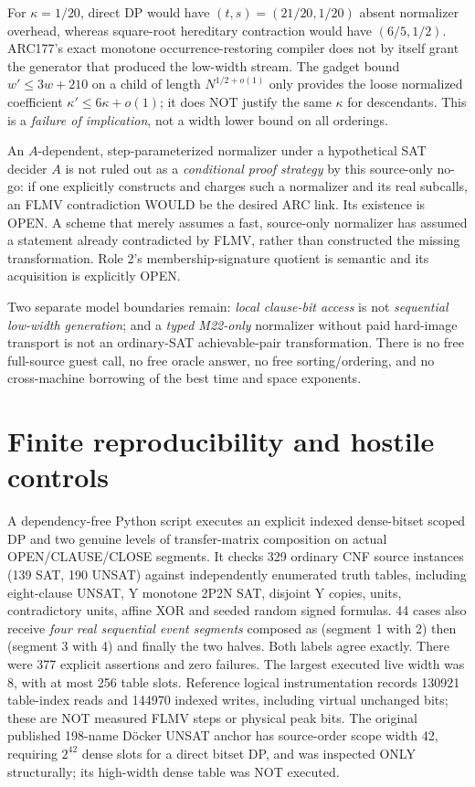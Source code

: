 \documentclass[11pt]{article}
\begin{document}
For $\kappa=1/20$, direct DP would have $(t,s)=(21/20,1/20)$ absent
normalizer overhead, whereas square-root hereditary contraction would have
$(6/5,1/2)$. ARC177's exact monotone occurrence-restoring compiler does not
by itself grant the generator that produced the low-width stream. The
gadget bound $w'\le3w+210$ on a child of length $N^{1/2+o(1)}$
only provides the loose normalized coefficient $\kappa'\le6\kappa+o(1)$;
it does NOT justify the same $\kappa$ for descendants. This is a
\emph{failure of implication}, not a width lower bound on all orderings.

An $A$-dependent, step-parameterized normalizer under a hypothetical SAT
decider $A$ is not ruled out as a \emph{conditional proof strategy} by this
source-only no-go: if one explicitly constructs and charges such a normalizer
and its real subcalls, an FLMV contradiction WOULD be the desired ARC link.
Its existence is OPEN. A scheme that merely assumes a fast, source-only
normalizer has assumed a statement already contradicted by FLMV, rather
than constructed the missing transformation. Role 2's membership-signature
quotient is semantic and its acquisition is explicitly OPEN.

Two separate model boundaries remain: \emph{local clause-bit access} is not
\emph{sequential low-width generation}; and a \emph{typed M22-only}
normalizer without paid hard-image transport is not an ordinary-SAT
achievable-pair transformation. There is no free full-source guest call,
no free oracle answer, no free sorting/ordering, and no cross-machine
borrowing of the best time and space exponents.

\section{Finite reproducibility and hostile controls}
A dependency-free Python script executes an explicit indexed dense-bitset
scoped DP and two genuine levels of transfer-matrix composition on actual
OPEN/CLAUSE/CLOSE segments. It checks 329 ordinary CNF source instances
(139 SAT, 190 UNSAT) against independently enumerated truth tables,
including eight-clause UNSAT, Y monotone 2P2N SAT, disjoint Y copies, units,
contradictory units, affine XOR and seeded random signed formulas.
44 cases also receive \emph{four real sequential event segments} composed
as (segment 1 with 2) then (segment 3 with 4) and finally the two halves.
Both labels agree exactly. There were 377 explicit assertions and zero
failures. The largest executed live width was 8, with at most 256 table slots.
Reference logical instrumentation records 130921 table-index reads and
144970 indexed writes, including virtual unchanged bits; these are NOT
measured FLMV steps or physical peak bits. The original published 198-name
D\"ocker UNSAT anchor has source-order scope width 42, requiring $2^{42}$
dense slots for a direct bitset DP, and was inspected ONLY structurally;
its high-width dense table was NOT executed.
\end{document}
